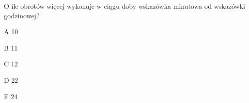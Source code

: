 \begin{tresc}
O ile obrotów więcej wykonuje w ciągu doby wskazówka minutowa od wskazówki godzinowej?
\end{tresc}
\begin{wariant}{A} 10 \end{wariant}
\begin{wariant}{B} 11 \end{wariant}
\begin{wariant}{C} 12 \end{wariant}
\begin{wariant}{D} 22 \end{wariant}
\begin{wariant}{E} 24 \end{wariant}

